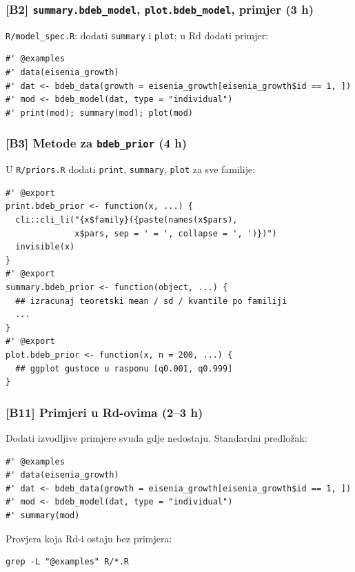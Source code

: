 \documentclass[11pt,a4paper]{article}
\newcommand{\file}[1]{\texttt{\small #1}}
\newcommand{\code}[1]{\texttt{\small #1}}
\begin{document}
\subsubsection*{[B2] \texttt{summary.bdeb\_model}, \texttt{plot.bdeb\_model},
primjer (3 h)}

\file{R/model\_spec.R}: dodati \code{summary} i \code{plot}; u Rd
dodati primjer:

\begin{lstlisting}
#' @examples
#' data(eisenia_growth)
#' dat <- bdeb_data(growth = eisenia_growth[eisenia_growth$id == 1, ])
#' mod <- bdeb_model(dat, type = "individual")
#' print(mod); summary(mod); plot(mod)
\end{lstlisting}

\subsubsection*{[B3] Metode za \texttt{bdeb\_prior} (4 h)}

U \file{R/priors.R} dodati \code{print}, \code{summary}, \code{plot}
za sve familije:

\begin{lstlisting}
#' @export
print.bdeb_prior <- function(x, ...) {
  cli::cli_li("{x$family}({paste(names(x$pars),
              x$pars, sep = ' = ', collapse = ', ')})")
  invisible(x)
}
#' @export
summary.bdeb_prior <- function(object, ...) {
  ## izracunaj teoretski mean / sd / kvantile po familiji
  ...
}
#' @export
plot.bdeb_prior <- function(x, n = 200, ...) {
  ## ggplot gustoce u rasponu [q0.001, q0.999]
}
\end{lstlisting}

\subsubsection*{[B11] Primjeri u Rd-ovima (2--3 h)}

Dodati izvodljive primjere svuda gdje nedostaju.  Standardni
predložak:

\begin{lstlisting}
#' @examples
#' data(eisenia_growth)
#' dat <- bdeb_data(growth = eisenia_growth[eisenia_growth$id == 1, ])
#' mod <- bdeb_model(dat, type = "individual")
#' summary(mod)
\end{lstlisting}

\noindent Provjera koja Rd-i ostaju bez primjera:
\begin{lstlisting}[style=Shellstyle]
grep -L "@examples" R/*.R
\end{lstlisting}
\end{document}
